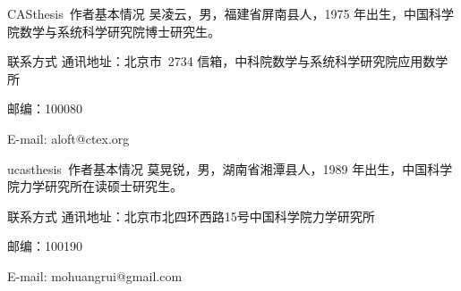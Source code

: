 
\begin{resume}

\begin{resumesection}{CASthesis~作者基本情况}
吴凌云，男，福建省屏南县人，1975 年出生，中国科学院数学与系统科学研究院博士研究生。
\end{resumesection}

\begin{resumelist}{联系方式}
通讯地址：北京市~2734 信箱，中科院数学与系统科学研究院应用数学所

邮编：100080

E-mail: aloft@ctex.org
\end{resumelist}

\begin{resumesection}{ucasthesis~作者基本情况}
莫晃锐，男，湖南省湘潭县人，1989 年出生，中国科学院力学研究所在读硕士研究生。
\end{resumesection}

\begin{resumelist}{联系方式}
通讯地址：北京市北四环西路15号中国科学院力学研究所

邮编：100190

E-mail: mohuangrui@gmail.com
\end{resumelist}

\end{resume}
